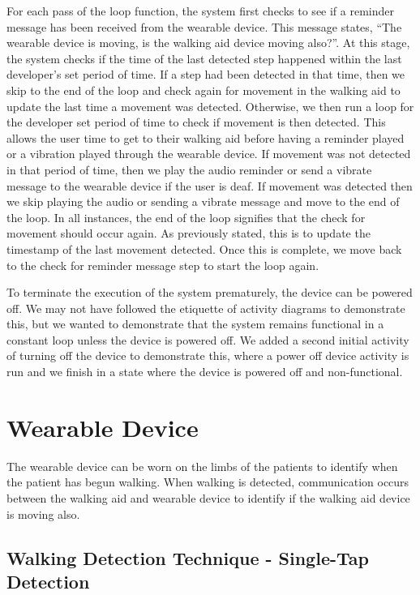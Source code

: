                         For each pass of the loop function, the system first checks to see if a reminder message has been received from the wearable device. This message states, ``The wearable device is moving, is the walking aid device moving also?''. At this stage, the system checks if the time of the last detected step happened within the last developer's set period of time. If a step had been detected in that time, then we skip to the end of the loop and check again for movement in the walking aid to update the last time a movement was detected. Otherwise, we then run a loop for the developer set period of time to check if movement is then detected. This allows the user time to get to their walking aid before having a reminder played or a vibration played through the wearable device. If movement was not detected in that period of time, then we play the audio reminder or send a vibrate message to the wearable device if the user is deaf. If movement was detected then we skip playing the audio or sending a vibrate message and move to the end of the loop. In all instances, the end of the loop signifies that the check for movement should occur again. As previously stated, this is to update the timestamp of the last movement detected. Once this is complete, we move back to the check for reminder message step to start the loop again.
        
                        To terminate the execution of the system prematurely, the device can be powered off. We may not have followed the etiquette of activity diagrams to demonstrate this, but we wanted to demonstrate that the system remains functional in a constant loop unless the device is powered off. We added a second initial activity of turning off the device to demonstrate this, where a power off device activity is run and we finish in a state where the device is powered off and non-functional.
                    
            \section{Wearable Device}
            \label{sec:wearabledevice}
        
                The wearable device can be worn on the limbs of the patients to identify when the patient has begun walking. When walking is detected, communication occurs between the walking aid and wearable device to identify if the walking aid device is moving also. 
        
                \subsection{Walking Detection Technique - Single-Tap Detection}
                \label{subsec:walking_detection_technique}
        
